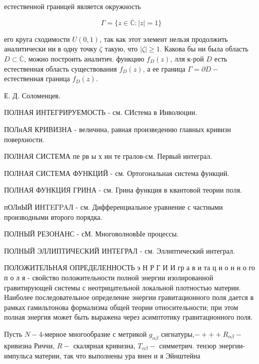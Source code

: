 \documentclass[10pt]{article}
\begin{document}
естественной границей является окружность



\[

\Gamma=\{z \in \overline{\mathbb{C}}:|z|=1\}

\]



его круга сходимости $U(0,1)$, так как этот элемент нельзя продолжить аналитически ни в одну точку $\zeta$ такую, что $|\zeta| \geqslant 1$. Какова бы ни была область $D \subset \overline{\mathbb{C}}$, можно построить аналитич. функцию $f_{D}(z)$, лля к-рой $D$ есть естественная область существования $f_{D}(z)$, а ее граница $\Gamma=\partial D-$ естественная граница $f_{D}(z)$.



Е. Д. Соломенцев.



ПОЛНАЯ ИНТЕГРИРУЕМОСТЬ - см. СИстема в Инволюции.



ПОЛнАЯ КРИВИЗНА - величина, равная произведению главных кривизн поверхности.



ПОЛНАЯ СИСТЕМА пе рв ы х ин те гралов-см. Первый интеграл.



ПОЛНАЯ СИСТЕМА ФУНКЦИЙ - см. Ортогональная система функций.



ПОЛНАЯ ФУНКЦИЯ ГРИНА - см. Грина функция в квантовой теории поля.



пОЛнЫЙ ИНTEГPAЛ - см. Дифференциальное уравнение с частными производными второго порядка.



ПОЛНЫЙ РЕЗОНАНС - сМ. МноговолновЫе процессы.



ПОЛНЫЙ ЭЛЛИПТИЧЕСКИЙ ИНТЕГРАЛ - см. Эллиптический интеграл.



ПОЛОЖИТЕЛЬНАЯ ОПРЕДЕЛЕННОСТЬ э Н Р Г И И гр а в и та ц и о н н о го п о л я - свойство положительности полной энергии изолированной гравитирующей системы с неотрицательной локальной плотностью материи. Наиболее последовательное определение энергии гравитационного поля дается в рамках гамильтонова формализма общей теории относительности; при этом полная энергия может быть выражена через асимптотику гравитационного поля.



Пусть $N-4$-мерное многообразие с метрикой $g_{\alpha \beta}$ сигнатуры,$-+++ R_{\alpha \beta}-$ кривизна Риччи, $R-$ скалярная кривизна, $T_{\alpha \beta}-$ симметрич. тензор энергии-импульса материи, так что выполнены ура внен и я Эйнштейна
\end{document}

